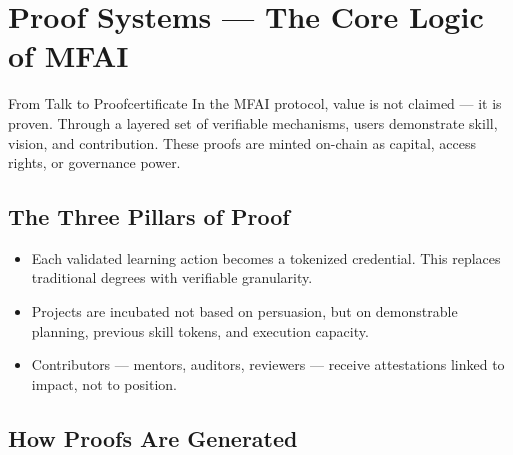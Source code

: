 \section{Proof Systems — The Core Logic of MFAI}

\begin{mfai-box}{From Talk to Proof}{certificate}
In the MFAI protocol, value is not claimed — it is proven. Through a layered set of verifiable mechanisms, users demonstrate skill, vision, and contribution. These proofs are minted on-chain as capital, access rights, or governance power.
\end{mfai-box}

\vspace{1em}

\subsection*{The Three Pillars of Proof}

\begin{itemize}
  \item {} Each validated learning action becomes a tokenized credential. This replaces traditional degrees with verifiable granularity.
  \item {} Projects are incubated not based on persuasion, but on demonstrable planning, previous skill tokens, and execution capacity.
  \item {} Contributors — mentors, auditors, reviewers — receive attestations linked to impact, not to position.
\end{itemize}

\vspace{2em}

\subsection*{How Proofs Are Generated}

\begin{center}
\end{center}

